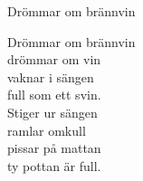 \begin{song}{Drömmar om brännvin}
	
	
	
	Drömmar om brännvin\\
	drömmar om vin\\
	vaknar i sängen\\
	full som ett svin.\\
	Stiger ur sängen\\
	ramlar omkull\\
	pissar på mattan\\
	ty pottan är full.
	
\end{song}
